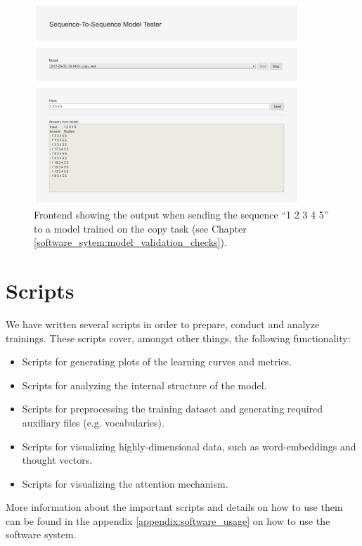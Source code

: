 \begin{figure}[H]
	\centering
	\includegraphics[width=10cm]{img/web_frontend_inference}
	\caption{Frontend showing the output when sending the sequence ``1 2 3 4 5'' to a model trained on the copy task (see Chapter \ref{software_sytem:model_validation_checks}).}
\end{figure}

\section{Scripts}
We have written several scripts in order to prepare, conduct and analyze trainings. These scripts cover, amongst other things, the following functionality:

\begin{itemize}[noitemsep]
	\item Scripts for generating plots of the learning curves and metrics.
	\item Scripts for analyzing the internal structure of the model.
	\item Scripts for preprocessing the training dataset and generating required auxiliary files (e.g. vocabularies).
	\item Scripts for visualizing highly-dimensional data, such as word-embeddings and thought vectors.
	\item Scripts for visualizing the attention mechanism.
\end{itemize}

More information about the important scripts and details on how to use them can be found in the appendix \ref{appendix:software_usage} on how to use the software system.

